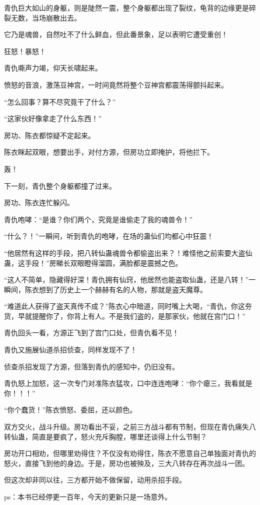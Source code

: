 \begin{this_body}
青仇巨大如山的身躯，则是陡然一震，整个身躯都出现了裂纹，龟背的边缘更是碎裂无数，当场崩散出去。

它乃是魂兽，自然吐不了什么鲜血，但此番景象，足以表明它遭受重创！

狂怒！暴怒！

青仇嘶声力竭，仰天长啸起来。

愤怒的音浪，激荡豆神宫，一时间竟然将整个豆神宫都震荡得颤抖起来。

“怎么回事？算不尽究竟干了什么？”

“这家伙好像拿走了什么东西！”

房功、陈衣都惊疑不定起来。

陈衣眯起双眼，想要出手，对付方源，但房功立即掩护，将他拦下。

轰！

下一刻，青仇整个身躯都撞了过来。

房功、陈衣连忙躲闪。

青仇咆哮：“是谁？你们两个，究竟是谁偷走了我的魂兽令！”

“什么？！”一瞬间，听到青仇的咆哮，在场的蛊仙们均都心中狂震！

“他居然有这样的手段，把八转仙蛊魂兽令都偷盗出来？！难怪他之前索要大盗仙蛊，这手段！”房睇长双眼瞪得溜圆，满脸都是震撼之色。

“这人不简单，隐藏得好深！青仇拥有仙窍，他居然也能盗取仙蛊，还是八转！”一瞬间，陈衣想到了历史上一个赫赫有名的人物，那就是盗天魔尊。

“难道此人获得了盗天真传不成？”陈衣心中暗道，同时嘴上大喝，“青仇，你这夯货，早就提醒你了，你背上有人。不是我们盗的，是那家伙，他就在宫门口！”

青仇回头一看，方源正飞到了宫门口处，但青仇看不见！

青仇又施展仙道杀招侦查，同样发现不了！

侦查杀招发现了方源，但落到青仇的感知中，仍旧没有。

青仇怒上加怒，这一次专门对准陈衣猛攻，口中连连咆哮：“你个瘪三，我看就是你！！！”

“你个蠢货！”陈衣愤怒、委屈，还以颜色。

双方交火，战斗升级。房功看出不妥，之前三方战斗都有节制，但现在青仇痛失八转仙蛊，简直是要疯了，怒火充斥胸膛，哪里还谈得上什么节制？

房功开口相劝，但哪里劝得住？不仅没有劝得住，陈衣不愿意自己单独面对青仇的怒火，直接飞到他的身边。于是，房功也被殃及，三大八转存在再次战斗一团。

但这次却非同以往，三方都开始不做保留，动用杀招手段。

ps：本书已经停更一百年，今天的更新只是一场意外。

\end{this_body}

